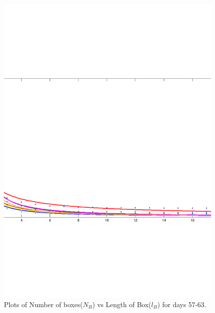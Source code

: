 \documentclass{article}
\begin{document}
\begin{figure}
\centering
\includegraphics[scale=0.3]{plot9/plot9}
\caption{Plots of Number of boxes($N_B$) vs Length of Box($l_B$) for days 57-63.}
\end{figure}
\end{document}
